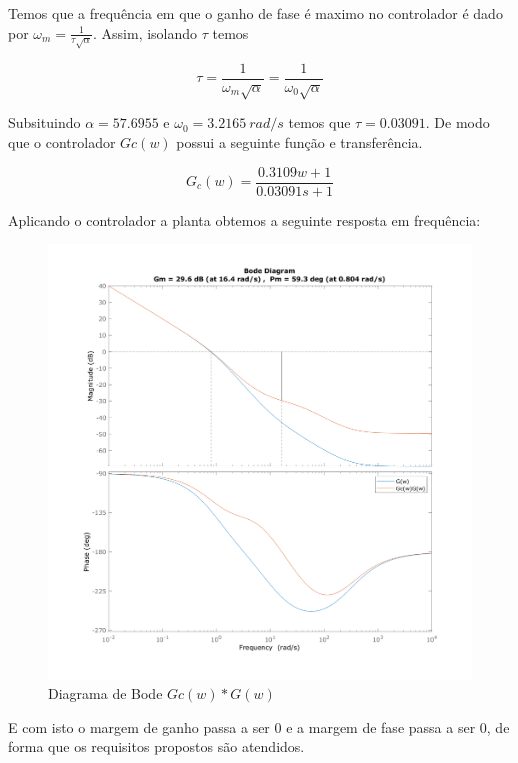 \documentclass[a4paper,11pt]{article}
\begin{document}
Temos que a frequência em que o ganho de fase é maximo no controlador é dado por $\omega_m = \frac{1}{\tau\sqrt{\alpha}}$. Assim, isolando $\tau$ temos

\begin{equation}
    \tau = \frac{1}{\omega_m\sqrt{\alpha}} = \frac{1}{\omega_{0}\sqrt{\alpha}}
\end{equation}

Subsituindo $\alpha = 57.6955$ e $\omega_0 = 3.2165\ rad/s $ temos que $\tau = 0.03091$. De modo que o controlador $Gc(w)$ possui a seguinte função e transferência.

\begin{equation}
    G_c(w) = \frac{0.3109 w + 1}{0.03091 s + 1}
\end{equation}

Aplicando o controlador a planta obtemos a seguinte resposta em frequência:

\begin{figure}[H]
    \centering
    \includegraphics[width=0.8\linewidth]{img/exsim4-control-gw.png}
    \caption{Diagrama de Bode $Gc(w)*G(w)$}
\end{figure}

E com isto o margem de ganho passa a ser $0$ e a margem de fase passa a ser $0$, de forma que os requisitos propostos são atendidos.

\subsection{}
\end{document}
